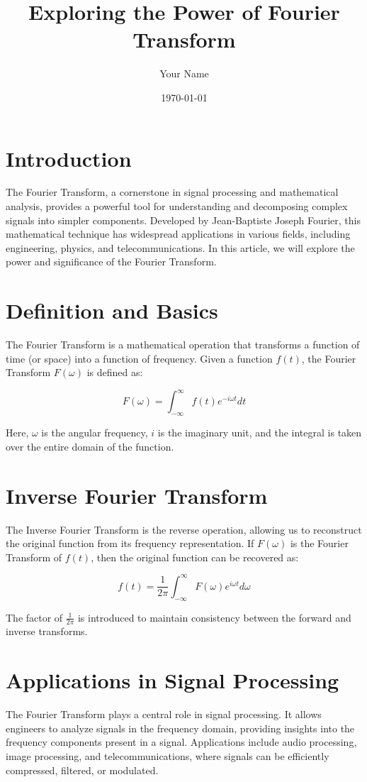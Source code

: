 \documentclass{article}
\title{Exploring the Power of Fourier Transform}
\author{Your Name}
\date{\today}
\begin{document}
\maketitle

\section*{Introduction}
The Fourier Transform, a cornerstone in signal processing and mathematical analysis, provides a powerful tool for understanding and decomposing complex signals into simpler components. Developed by Jean-Baptiste Joseph Fourier, this mathematical technique has widespread applications in various fields, including engineering, physics, and telecommunications. In this article, we will explore the power and significance of the Fourier Transform.

\section*{Definition and Basics}
The Fourier Transform is a mathematical operation that transforms a function of time (or space) into a function of frequency. Given a function $f(t)$, the Fourier Transform $F(\omega)$ is defined as:

\begin{equation}
F(\omega) = \int_{-\infty}^{\infty} f(t) e^{-i\omega t} dt
\end{equation}

Here, $\omega$ is the angular frequency, $i$ is the imaginary unit, and the integral is taken over the entire domain of the function.

\section*{Inverse Fourier Transform}
The Inverse Fourier Transform is the reverse operation, allowing us to reconstruct the original function from its frequency representation. If $F(\omega)$ is the Fourier Transform of $f(t)$, then the original function can be recovered as:

\begin{equation}
f(t) = \frac{1}{2\pi} \int_{-\infty}^{\infty} F(\omega) e^{i\omega t} d\omega
\end{equation}

The factor of $\frac{1}{2\pi}$ is introduced to maintain consistency between the forward and inverse transforms.

\section*{Applications in Signal Processing}
The Fourier Transform plays a central role in signal processing. It allows engineers to analyze signals in the frequency domain, providing insights into the frequency components present in a signal. Applications include audio processing, image processing, and telecommunications, where signals can be efficiently compressed, filtered, or modulated.
\end{document}

